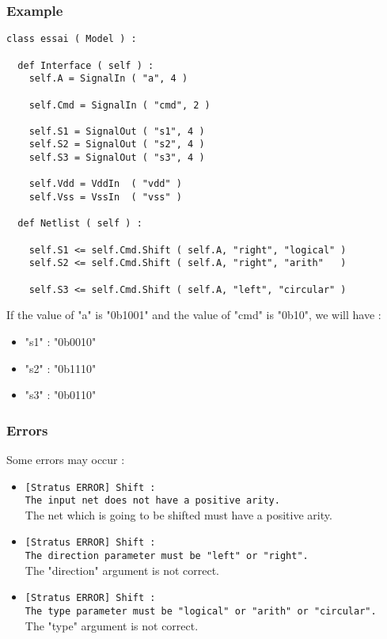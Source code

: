 \subsubsection{Example}

\begin{verbatim}
class essai ( Model ) :

  def Interface ( self ) :
    self.A = SignalIn ( "a", 4 )
    
    self.Cmd = SignalIn ( "cmd", 2 )
    
    self.S1 = SignalOut ( "s1", 4 )
    self.S2 = SignalOut ( "s2", 4 )
    self.S3 = SignalOut ( "s3", 4 )

    self.Vdd = VddIn  ( "vdd" )
    self.Vss = VssIn  ( "vss" )
	
  def Netlist ( self ) :

    self.S1 <= self.Cmd.Shift ( self.A, "right", "logical" ) 
    self.S2 <= self.Cmd.Shift ( self.A, "right", "arith"   ) 
    
    self.S3 <= self.Cmd.Shift ( self.A, "left", "circular" ) 
\end{verbatim}
\indent If the value of "a" is "0b1001" and the value of "cmd" is "0b10", we will have :
\begin{itemize}
    \item "s1" : "0b0010"
    \item "s2" : "0b1110"
    \item "s3" : "0b0110"
\end{itemize}
    
\subsubsection{Errors}
    
Some errors may occur :
\begin{itemize}
    \item \verb-[Stratus ERROR] Shift :-\\\verb-The input net does not have a positive arity.-\\The net which is going to be shifted must have a positive arity.
    \item \verb-[Stratus ERROR] Shift :-\\\verb-The direction parameter must be "left" or "right".-\\The "direction" argument is not correct.
    \item \verb-[Stratus ERROR] Shift :-\\\verb-The type parameter must be "logical" or "arith" or "circular".-\\The "type" argument is not correct.
\end{itemize}


